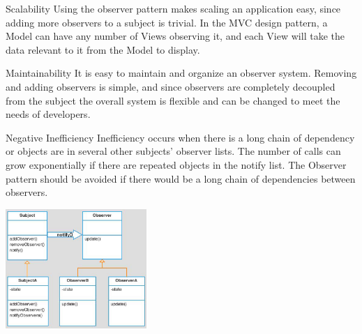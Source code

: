 \begin{nfps}
\item[Scalability] Using the observer pattern makes scaling an application
    easy, since adding more observers to a subject is trivial. In the MVC
    design pattern, a {\sc Model} can have any number of {\sc Views} observing
    it, and each {\sc View} will take the data relevant to it from the {\sc
        Model} to display.
\item[Maintainability] It is easy to maintain and organize an observer system. 
    Removing and adding observers is simple, and since observers are completely
    decoupled from the subject the overall system is flexible and can be
    changed to meet the needs of developers.
\item[Negative Inefficiency] Inefficiency occurs when there
    is a long chain of dependency or objects are in several other subjects’
    observer lists. The number of calls can grow exponentially if there
    are repeated objects in the notify list. The Observer pattern should be
    avoided if there would be a long chain of dependencies between observers.
\end{nfps}

\begin{center}
    \includegraphics[width=0.4\textwidth]{./observer1}
\end{center}

